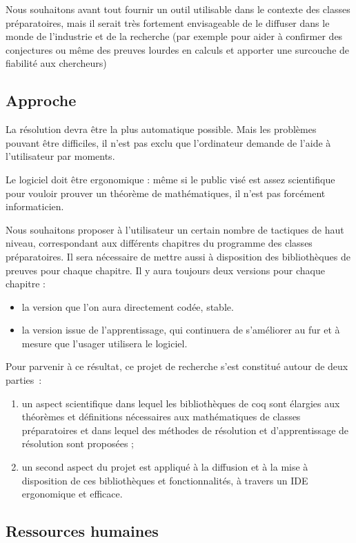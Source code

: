 \documentclass[a4paper,10pt]{article}
\begin{document}
Nous souhaitons avant tout fournir un outil utilisable dans le contexte des classes préparatoires, mais il serait très fortement envisageable de le diffuser dans le monde de l'industrie et de la recherche (par exemple pour aider à confirmer des conjectures ou même des preuves lourdes en calculs et apporter une surcouche de fiabilité aux chercheurs)

\subsection{Approche}

La résolution devra être la plus automatique possible. Mais les problèmes pouvant être difficiles, il n'est pas exclu que l'ordinateur demande de l'aide à l'utilisateur par moments.

Le logiciel doit être ergonomique : même si le public visé est assez scientifique pour vouloir prouver un théorème de mathématiques, il n'est pas forcément informaticien.

Nous souhaitons proposer à l'utilisateur un certain nombre de tactiques de haut niveau, correspondant aux différents chapitres du programme des classes préparatoires. Il sera nécessaire de mettre aussi à disposition des bibliothèques de preuves pour chaque chapitre. Il y aura toujours deux versions pour chaque chapitre :
\begin{itemize}
  \item la version que l'on aura directement codée, stable.
  \item la version issue de l'apprentissage, qui continuera de s'améliorer au fur et à mesure que l'usager utilisera le logiciel.
\end{itemize}

Pour parvenir à ce résultat, ce projet de recherche s'est constitué autour de deux parties :

\begin{enumerate}
\item un aspect scientifique dans lequel les bibliothèques de coq sont élargies aux théorèmes et définitions nécessaires aux mathématiques de classes préparatoires et dans lequel des méthodes de résolution et d'apprentissage de résolution sont proposées ;
\item un second aspect du projet est appliqué à la diffusion et à la mise à disposition de ces bibliothèques et fonctionnalités, à travers un IDE ergonomique et efficace.
\end{enumerate}

\subsection{Ressources humaines}
\end{document}
